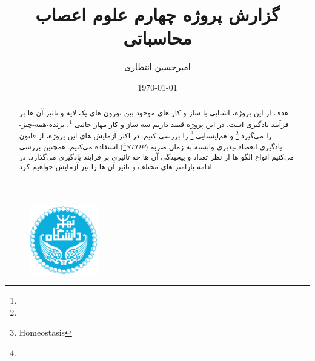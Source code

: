 \documentclass{report}
\title{گزارش پروژه چهارم علوم اعصاب محاسباتی}
\author{امیرحسین انتظاری}
\date{\today}
\begin{document}
\begin{figure}
    \centering \includegraphics[height=3cm]{images/Logo.png}
\end{figure}
\renewcommand{\chaptername}{بخش}
\newpage
\maketitle
\newpage
\tableofcontents

    \begin{abstract}
        هدف از این پروژه، آشنایی با ساز و کار های موجود بین نورون های یک لایه و تاثیر آن ها بر فرآیند یادگیری است. در این پروژه قصد داریم سه ساز و کار مهار جانبی
        \footnote{}، 
        برنده-همه-چیز-را-می‌گیرد
        \footnote{} و
        هم‌ایستایی
        \footnote{Homeostasis} 
        را بررسی کنیم. در اکثر آزمایش های این پروژه، از قانون یادگیری انعطاف‌پذیری وابسته به زمان ضربه 
        ($STDP$\footnote{}) 
        استفاده می‌کنیم. همچنین بررسی می‌کنیم انواع الگو ها از نظر تعداد و پیچیدگی آن ها چه تاثیری بر فرایند یادگیری می‌گذارد. در ادامه پارامتر های مختلف و تاثیر آن ها را نیز آزمایش خواهیم کرد.
    \end{abstract}
\restoregeometry


\newpage

\newpage



\end{document}
